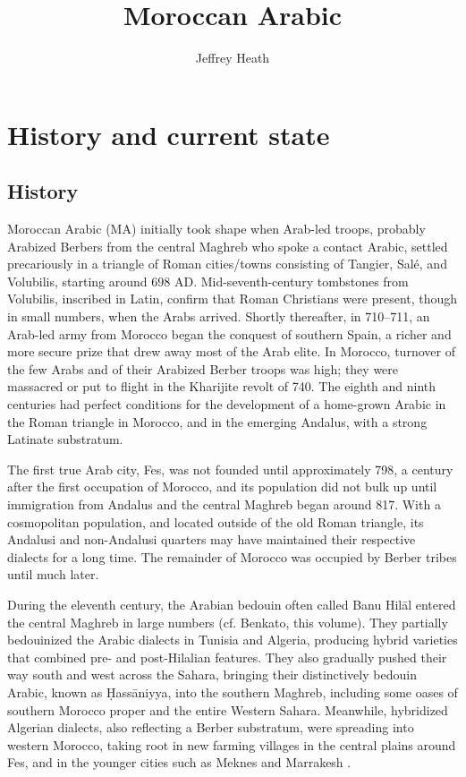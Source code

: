 \documentclass[output=paper]{langsci/langscibook}
\title{Moroccan Arabic}
\author{Jeffrey Heath\affiliation{University of Michigan}}
\begin{document}
\section{History and current state}

\subsection{History}

Moroccan Arabic (MA) initially took shape when Arab-led troops, probably Arabized Berbers from the central Maghreb who spoke a contact Arabic, settled precariously in a triangle of Roman cities/towns consisting of Tangier, Salé, and Volubilis, starting around 698 AD. Mid-seventh-century tombstones from Volubilis, inscribed in Latin, confirm that Roman Christians were present, though in small numbers, when the Arabs arrived. Shortly thereafter, in 710–711, an Arab-led army from Morocco began the conquest of southern Spain, a richer and more secure prize that drew away most of the Arab elite. In Morocco, turnover of the few Arabs and of their Arabized Berber troops was high; they were massacred or put to flight in the Kharijite revolt of 740. The eighth and ninth centuries had perfect conditions for the development of a home-grown Arabic in the Roman triangle in Morocco, and in the emerging Andalus, with a strong Latinate substratum.  

The first true Arab city, Fes, was not founded until approximately 798, a century after the first occupation of Morocco, and its population did not bulk up until immigration from Andalus and the central Maghreb began around 817. With a cosmopolitan population, and located outside of the old Roman triangle, its Andalusi and non-Andalusi quarters may have maintained their respective dialects for a long time. The remainder of Morocco was occupied by Berber tribes until much later.

During the eleventh century, the Arabian bedouin often called Banu Hilāl entered the central Maghreb in large numbers (cf. Benkato, this volume). They partially bedouinized the Arabic dialects in Tunisia and Algeria, producing hybrid varieties that combined pre- and post-Hilalian features. They also gradually pushed their way south and west across the Sahara, bringing their distinctively bedouin Arabic, known as Ḥassāniyya, into the southern Maghreb, including some oases of southern Morocco proper and the entire Western Sahara. Meanwhile, hybridized Algerian dialects, also reflecting a Berber substratum, were spreading into western Morocco, taking root in new farming villages in the central plains around Fes, and in the younger cities such as Meknes and Marrakesh \citep{Heath2002}.
\end{document}
